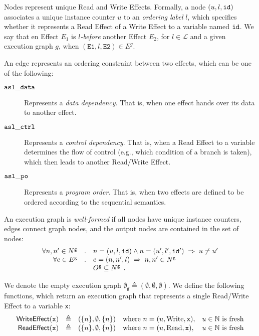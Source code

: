 \documentclass{book}
\newcommand\xgraph[0]{\textsf{g}}
\newcommand\emptygraph[0]{{\emptyset}_\xgraph}
\newcommand\Read[0]{\text{Read}}
\newcommand\Write[0]{\text{Write}}
\newcommand\Labels[0]{\mathcal{L}}
\newcommand\WriteEffect[0]{\textsf{WriteEffect}}
\newcommand\ReadEffect[0]{\textsf{ReadEffect}}
\newcommand\vx[0]{\texttt{x}}
\begin{document}
Nodes represent unique Read and Write Effects. Formally, a node $(u,l,\texttt{id})$ associates a unique instance counter $u$
to an \emph{ordering label} $l$, which specifies whether it represents a Read Effect of a Write Effect to a variable named $\texttt{id}$.
%
We say that en Effect $E_1$ is \emph{$l$-before} another Effect $E_2$, for $l\in \Labels$ and a given execution graph
$g$, when $(\texttt{E1}, l, \texttt{E2}) \in E^g$.

An edge represents an ordering constraint between two effects, which can be one of the following:
\begin{description}
\item[$\mathtt{asl\_data}$] Represents a \emph{data dependency}.
That is, when one effect hands over its data to another effect.
\item[$\mathtt{asl\_ctrl}$] Represents a \emph{control dependency}.
That is, when a Read Effect to a variable determines the flow of control (e.g., which condition of a branch is taken),
which then leads to another Read/Write Effect.
\item[$\mathtt{asl\_po}$] Represents a \emph{program order}.
That is, when two effects are defined to be ordered according to the sequential semantics.
\end{description}

An execution graph is \emph{well-formed} if all nodes have unique instance counters, edges connect graph nodes,
and the output nodes are contained in the set of nodes:
\[
  \begin{array}{rcl}
  \forall n, n' \in N^\xgraph &.& n=(u,l,\id) \wedge n=(u',l',\id') \;\Rightarrow\; u \neq u' \\
  \forall e \in E^\xgraph &.& e=(n, n', l) \;\Rightarrow\; n, n' \in N^\xgraph \\
  & & O^\xgraph \subseteq N^\xgraph \enspace.
  \end{array}
\]

We denote the empty execution graph $\emptygraph \triangleq (\emptyset, \emptyset, \emptyset)$.
%
We define the following functions, which return an execution graph that represents a single Read/Write Effect to a variable \texttt{x}:
\[
  \begin{array}{rclll}
    \WriteEffect(\vx) &\triangleq& (\{n\}, \emptyset, \{n\}) & \text{where } n=(u, \Write, \vx), & u\in\N \text{ is fresh}\\
    \ReadEffect(\vx)  &\triangleq& (\{n\}, \emptyset, \{n\}) & \text{where } n=(u, \Read, \vx),   & u\in\N \text{ is fresh}\\
  \end{array}
\]
\end{document}
